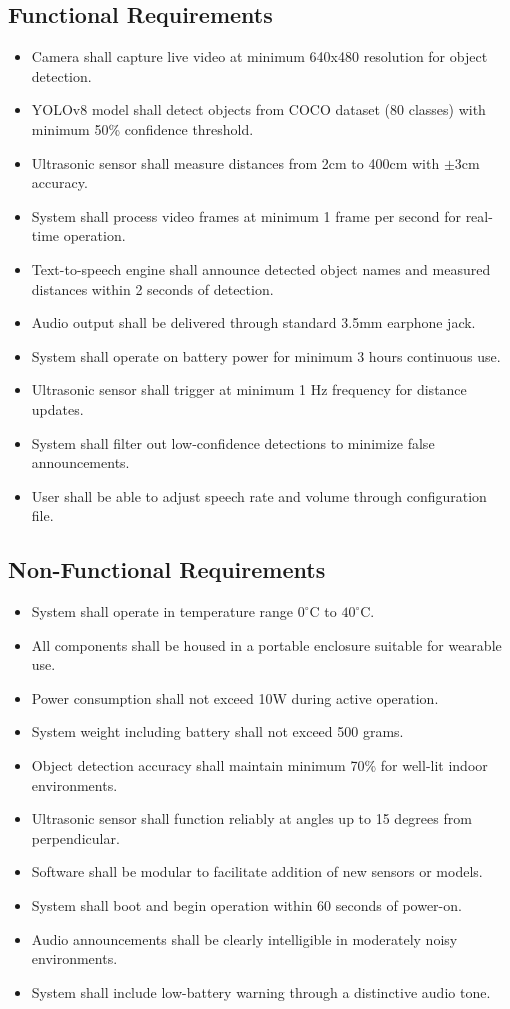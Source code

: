 \documentclass[conference]{IEEEtran}
\begin{document}
\subsection{Functional Requirements}
\begin{itemize}
    \item Camera shall capture live video at minimum 640x480 resolution for object detection.
    \item YOLOv8 model shall detect objects from COCO dataset (80 classes) with minimum 50\% confidence threshold.
    \item Ultrasonic sensor shall measure distances from 2cm to 400cm with $\pm$3cm accuracy.
    \item System shall process video frames at minimum 1 frame per second for real-time operation.
    \item Text-to-speech engine shall announce detected object names and measured distances within 2 seconds of detection.
    \item Audio output shall be delivered through standard 3.5mm earphone jack.
    \item System shall operate on battery power for minimum 3 hours continuous use.
    \item Ultrasonic sensor shall trigger at minimum 1 Hz frequency for distance updates.
    \item System shall filter out low-confidence detections to minimize false announcements.
    \item User shall be able to adjust speech rate and volume through configuration file.
\end{itemize}

\subsection{Non-Functional Requirements}
\begin{itemize}
    \item System shall operate in temperature range $0^{\circ}$C to $40^{\circ}$C.
    \item All components shall be housed in a portable enclosure suitable for wearable use.
    \item Power consumption shall not exceed 10W during active operation.
    \item System weight including battery shall not exceed 500 grams.
    \item Object detection accuracy shall maintain minimum 70\% for well-lit indoor environments.
    \item Ultrasonic sensor shall function reliably at angles up to 15 degrees from perpendicular.
    \item Software shall be modular to facilitate addition of new sensors or models.
    \item System shall boot and begin operation within 60 seconds of power-on.
    \item Audio announcements shall be clearly intelligible in moderately noisy environments.
    \item System shall include low-battery warning through a distinctive audio tone.
\end{itemize}
\end{document}
